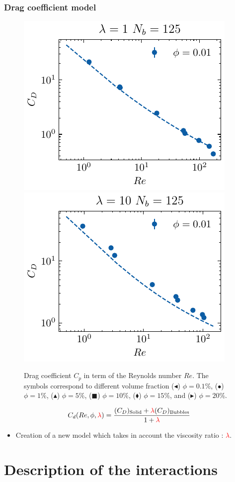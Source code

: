 \documentclass{sintefbeamer}
\begin{document}
\begin{frame}
  \frametitle{Drag coefficient model}
  \begin{figure}[h!]
    \centering    
    \includegraphics[height = 0.25\textwidth]{image/HOMOGENEOUS/fCA/Cp_N_5_l_1.pdf}
    \includegraphics[height = 0.25\textwidth]{image/HOMOGENEOUS/fCA/Cp_N_5_l_10.pdf}
    \caption{
        Drag coefficient $C_p$ in term of the Reynolds number $Re$.  
        The symbols correspond to different volume fraction ($\blacktriangleleft$) $\phi = 0.1$\%, ($\bullet$) $\phi = 1\%$, ($\blacktriangle$) $\phi = 5\%$, ($\blacksquare$) $\phi = 10\%$, ($\blacklozenge$) $\phi = 15\%$, and ($\blacktriangleright$) $\phi = 20$\%.
    }
    \label{fig:Cp}
\end{figure}
  
\begin{equation*}
  C_d(Re,\phi,\textcolor{red}{\lambda})
  = \frac{(C_D)_\text{Solid} + \textcolor{red}{\lambda} (C_D)_\text{Bubbles}}
  {1+\textcolor{red}{\lambda}}
\end{equation*}
\begin{itemize}
  \item Creation of a new model which takes in account the viscosity ratio : \textcolor{red}{$\lambda$}. 
\end{itemize}

\end{frame}

\section{Description of the interactions}
\section*{}
\end{document}
